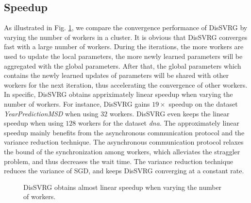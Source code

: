 \documentclass[preprint,review,11pt,a4paper]{elsarticle}
\begin{document}
\subsection{Speedup}
As illustrated in Fig. \ref{figure_evaluation2_speedup}, we compare the convergence performance of DisSVRG by varying the number of workers in a cluster. It is obvious that DisSVRG converges fast with a large number of workers. During the iterations, the more workers are used to update the local parameters, the more newly learned parameters will be aggregated with the global parameters. After that, the global parameters which contains the newly learned updates of parameters will be shared with other workers for the next iteration, thus accelerating the convergence of other workers. In specific, DisSVRG obtains appriximately linear speedup when varying the number of workers. For instance, DisSVRG gains $19\times$ speedup on the dataset \emph{YearPredictionMSD} when using $32$ workers. DisSVRG even keeps the linear speedup when using $128$ workers for the dataset \emph{dna}. The approximately linear speedup mainly benefits from the asynchronous communication protocol and the variance reduction technique. The asynchronous communication protocol relaxes the bound of the synchronization among workers, which alleviates the straggler problem, and thus decreases the wait time. The variance reduction technique reduces the variance of SGD, and keeps DisSVRG converging at a constant rate.

\begin{figure}
\centering
{}
\caption{DisSVRG obtains almost linear speedup when varying the number of workers.}
\label{figure_evaluation2_speedup}
\end{figure}
\end{document}

